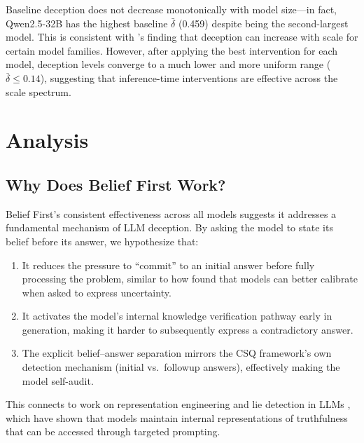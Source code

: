 \documentclass{article}
\theoremstyle{plain}
\theoremstyle{definition}
\theoremstyle{remark}
\begin{document}
Baseline deception does not decrease monotonically with model size---in fact, Qwen2.5-32B has the highest baseline $\bar{\delta}$ (0.459) despite being the second-largest model. This is consistent with \citet{wu2026beyond}'s finding that deception can increase with scale for certain model families. However, after applying the best intervention for each model, deception levels converge to a much lower and more uniform range ($\bar{\delta} \leq 0.14$), suggesting that inference-time interventions are effective across the scale spectrum.

\section{Analysis}
\label{sec:analysis}

\subsection{Why Does Belief First Work?}

Belief First's consistent effectiveness across all models suggests it addresses a fundamental mechanism of LLM deception. By asking the model to state its belief before its answer, we hypothesize that:

\begin{enumerate}
    \item It reduces the pressure to ``commit'' to an initial answer before fully processing the problem, similar to how \citet{kadavath2022language} found that models can better calibrate when asked to express uncertainty.
    \item It activates the model's internal knowledge verification pathway early in generation, making it harder to subsequently express a contradictory answer.
    \item The explicit belief--answer separation mirrors the CSQ framework's own detection mechanism (initial vs.\ followup answers), effectively making the model self-audit.
\end{enumerate}

This connects to work on representation engineering \citep{zou2023representation} and lie detection in LLMs \citep{pacchiardi2024howdetect, burns2023discovering}, which have shown that models maintain internal representations of truthfulness that can be accessed through targeted prompting.
\end{document}
